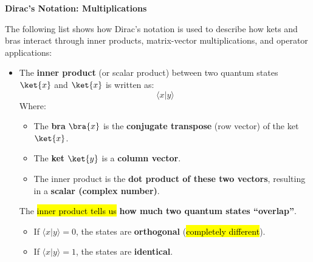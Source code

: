 \begin{flushleft}
    \textcolor{Green3}{ \textbf{Dirac's Notation: Multiplications}}
\end{flushleft}
The following list shows how Dirac's notation is used to describe how kets and bras interact through inner products, matrix-vector multiplications, and operator applications:
\begin{itemize}
    \item {}

    The \textbf{inner product} (or scalar product) between two quantum states $\ket{x}$ and $\ket{x}$ is written as:
    \begin{equation*}
        \langle x | y \rangle
    \end{equation*}
    Where:
    \begin{itemize}
        \item The \textbf{bra} $\bra{x}$ is the \textbf{conjugate transpose} (row vector) of the ket $\ket{x}$.
        \item The \textbf{ket} $\ket{y}$ is a \textbf{column vector}.
        \item The inner product is the \textbf{dot product of these two vectors}, resulting in a \textbf{scalar (complex number)}.
    \end{itemize}

    The \hl{inner product tells us} \textbf{how much two quantum states ``overlap''}.
    \begin{itemize}
        \item If $\langle x | y \rangle = 0$, the states are \textbf{orthogonal} (\hl{completely different}).
        \item If $\langle x | y \rangle = 1$, the states are \textbf{identical}.
    \end{itemize}


\end{itemize}
